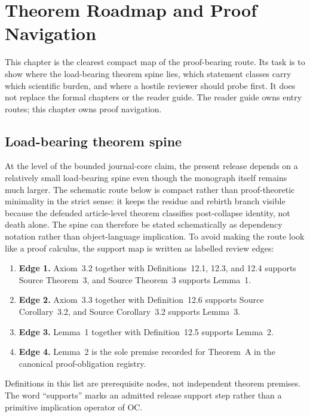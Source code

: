 \section{Theorem Roadmap and Proof Navigation}
\label{sec:oc13-theorem-roadmap}

This chapter is the clearest compact map of the proof-bearing route. Its task is
to show where the load-bearing theorem spine lies, which statement classes carry
which scientific burden, and where a hostile reviewer should probe first. It
does not replace the formal chapters or the reader guide. The reader guide owns
entry routes; this chapter owns proof navigation.

\subsection{Load-bearing theorem spine}

At the level of the bounded journal-core claim, the present release depends on
a relatively small load-bearing spine even though the monograph itself remains
much larger. The schematic route below is compact rather than proof-theoretic
minimality in the strict sense: it keeps the residue and rebirth branch visible
because the defended article-level theorem classifies post-collapse identity,
not death alone. The spine can therefore be stated schematically as
dependency notation rather than object-language implication. To avoid making
the route look like a proof calculus, the support map is written as labelled
review edges:

\begin{enumerate}
\item \textbf{Edge 1.} Axiom~3.2 together with Definitions~12.1, 12.3, and
      12.4 supports Source Theorem~3, and Source Theorem~3 supports Lemma~1.
\item \textbf{Edge 2.} Axiom~3.3 together with Definition~12.6 supports
      Source Corollary~3.2, and Source Corollary~3.2 supports Lemma~3.
\item \textbf{Edge 3.} Lemma~1 together with Definition~12.5 supports
      Lemma~2.
\item \textbf{Edge 4.} Lemma~2 is the sole premise recorded for Theorem~A in
      the canonical proof-obligation registry.
\end{enumerate}

Definitions in this list are prerequisite nodes, not independent theorem
premises. The word ``supports'' marks an admitted release support step rather
than a primitive implication operator of OC.

